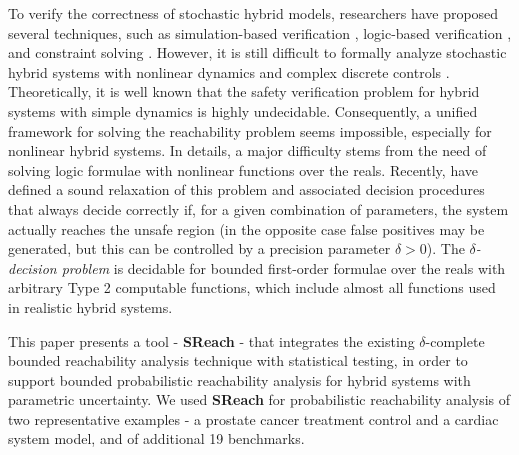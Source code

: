 To verify the correctness of stochastic hybrid models, researchers have proposed several techniques, such as simulation-based verification \cite{zuliani2010bayesian, abate2007probabilistic}, logic-based verification \cite{platzer2011stochastic}, and constraint solving \cite{franzle2008stochastic}. However, it is still difficult to formally analyze stochastic hybrid systems with nonlinear dynamics and complex discrete controls \cite{alur2011formal, henzinger2000theory}. Theoretically, it is well known that the safety verification problem for hybrid systems with simple dynamics is highly undecidable. Consequently, a unified framework for solving the reachability problem seems impossible, especially for nonlinear hybrid systems. In details, a major difficulty stems from the need of solving logic formulae with nonlinear functions over the reals. Recently, \cite{gao2013dreal, gao2013satisfiability} 
have defined a sound relaxation of this problem and associated decision procedures that always decide correctly 
if, for a given combination of parameters, the system actually reaches the unsafe region (in the opposite case
false positives may be generated, but this can be controlled by a precision parameter $\delta>0$).
The $\delta${\em -decision problem} is decidable for bounded first-order formulae over the reals with arbitrary 
Type 2 computable functions, which include almost all functions used in realistic hybrid systems.   

This paper presents a tool - {\bf SReach} - that integrates the existing $\delta$-complete bounded 
reachability analysis technique \cite{gaodelta} with statistical testing, in order
to support bounded probabilistic reachability analysis for hybrid systems with parametric uncertainty. 
We used {\bf SReach} for probabilistic reachability analysis of two representative examples - a prostate cancer 
treatment control and a cardiac system model, and of additional 19 benchmarks.
